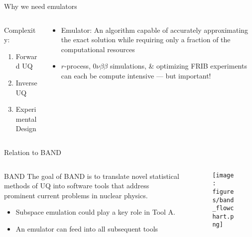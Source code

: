 \documentclass[xcolor=dvipsnames, aspectratio=169]{beamer}
\begin{document}
\begin{frame}{Why we need emulators}

\begin{columns}
\begin{column}{0.5\textwidth}
Complexity:
\begin{enumerate}
\item {} Forward UQ
\item {} Inverse UQ
\item {} Experimental Design
\end{enumerate}
\end{column}
\begin{column}{0.5\textwidth}
\begin{itemize}
\item Emulator: An algorithm capable of accurately approximating the exact solution while requiring only a fraction of the computational resources
\item $r$-process, $0\nu\beta\beta$ simulations, \& optimizing FRIB experiments can each be compute intensive --- but important!
\end{itemize}
\end{column}

\end{columns}
 
\end{frame}


\begin{frame}[t]{Relation to BAND}

\begin{columns}
\begin{column}{0.4\textwidth}
\begin{myblock}[valign=center]{BAND}
The goal of BAND is to translate novel statistical methods of UQ into
software tools that address prominent current problems in nuclear physics.
\end{myblock}
\begin{itemize}
\item Subspace emulation could play a key role in \alert{Tool A}.
\item An emulator can feed into all subsequent tools
\end{itemize}
\end{column}
\begin{column}{0.6\textwidth}
\begin{figure}
\texttt{[image: figures/band\_flowchart.png]}
\end{figure}
\end{column}
\end{columns}
\end{frame}
\end{document}
